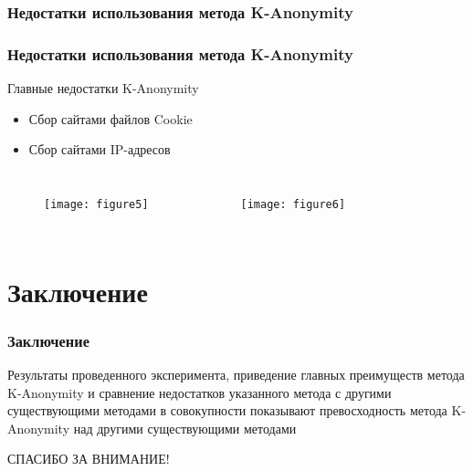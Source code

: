 \documentclass[russian]{beamer}
\begin{document}
\subsubsection{Недостатки использования метода K-Anonymity}
\begin{frame}
    \frametitle{Недостатки использования метода K-Anonymity}

    \begin{block}{Главные недостатки K-Anonymity}
        \begin{itemize}
            \item Сбор сайтами файлов Cookie
            \item Сбор сайтами IP-адресов
        \end{itemize}
    \end{block}

    \begin{columns}
        \begin{figure}[ht!]
       \texttt{[image: figure5]}
       \label{fig:5}
   \end{figure}

   \begin{figure}[ht!]
       \texttt{[image: figure6]}
       \label{fig:6}
   \end{figure}
    \end{columns}
\end{frame}

\section{Заключение}
\begin{frame}
    \frametitle{Заключение}
    
    Результаты проведенного эксперимента, приведение главных преимуществ метода K-Anonymity и сравнение недостатков указанного метода с другими существующими методами в совокупности показывают превосходность метода K-Anonymity над другими существующими методами
\end{frame}

\begin{frame}
    \begin{center}
        \Huge{СПАСИБО ЗА ВНИМАНИЕ!}
    \end{center}
\end{frame}
\end{document}
